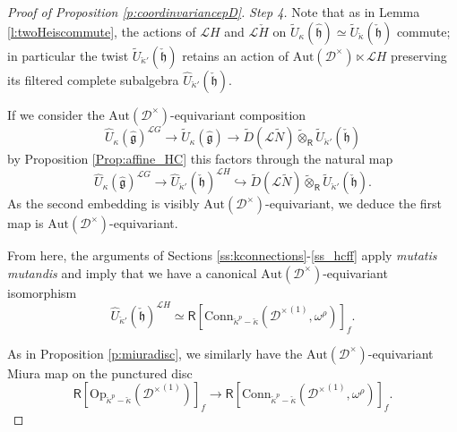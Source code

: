 \documentclass{amsart}
\theoremstyle{definition}
\newcommand{\fh}{\mathfrak{h}}
\newcommand{\fg}{\mathfrak{g}}
\newcommand{\fr}{^\on{(1)}}
\newcommand{\sD}{\mathscr{D}}
\newcommand{\on}{\mathrm}
\newcommand{\Ring}{\mathsf{R}}
\newcommand{\Loop}{\mathscr{L}}
\newcommand{\pD}{\sD^\times}
\newcommand{\ckappa}{\check{\kappa}}
\newcommand{\Conn}{\on{Conn}}
\newcommand{\Op}{\on{Op}}
\newcommand{\Aut}{\on{Aut}}
\numberwithin{equation}{section}
\begin{document}
\begin{proof}[Proof of Proposition \ref{p:coordinvariancepD}]
{\em Step 4.} Note that as in Lemma \ref{l:twoHeiscommute}, the actions of $\Loop H$ and $\Loop \check{H}$ on $\widetilde{U}_\kappa(\hat{\fh}) \simeq \widetilde{U}_{\ckappa}({\check{\fh}})$ commute; in particular the twist $\widetilde{U}_{\ckappa'}(\check{\fh})$ retains an action of $\Aut(\pD) \ltimes \Loop H$ preserving its filtered complete subalgebra $\widehat{U}_{\ckappa'}(\check{\fh})$. 


If we consider the $\Aut(\pD)$-equivariant composition 
$$\widehat{U}_\kappa(\hat{\fg})^{\Loop G} \rightarrow \widetilde{U}_\kappa(\hat{\fg}) \rightarrow \widetilde{D}(\Loop \tilde{N}) \widetilde{\otimes}_\Ring \widetilde{U}_{\ckappa'}(\check{\fh})$$
by Proposition \ref{Prop:affine_HC} this factors through the natural map 
$$\widehat{U}_\kappa(\hat{\fg})^{\Loop G} \rightarrow \widehat{U}_{\ckappa'}(\check{\fh})^{\Loop H} \hookrightarrow \widetilde{D}(\Loop \tilde{N}) \widetilde{\otimes}_\Ring \widetilde{U}_{\ckappa'}(\check{\fh}).$$As the second embedding is visibly $\Aut(\pD)$-equivariant, we deduce the first map is $\Aut(\pD)$-equivariant. 


From here, the arguments of Sections \ref{ss:kconnections}-\ref{ss_hcff} apply {\em mutatis mutandis} and imply that we have a canonical $\Aut(\pD)$-equivariant isomorphism 
$$\widehat{U}_{\ckappa'}(\check{\fh})^{\Loop H} \simeq \Ring[\Conn_{\ckappa^p - \ckappa}({\pD}\fr, \omega^\rho)]_f.$$ 



\iffalse 
 As in Proposition \ref{p:miuradisc}, we similarly have the $\Aut(\pD)$-equivariant  Miura map on the punctured disc
$$\Ring[\Op_{\ckappa^p - \ckappa}({\pD}\fr)]_f \rightarrow \Ring[\Conn_{\ckappa^p - \ckappa}({\pD}\fr, \omega^\rho)]_f.$$ 


\end{proof}
\end{document}
